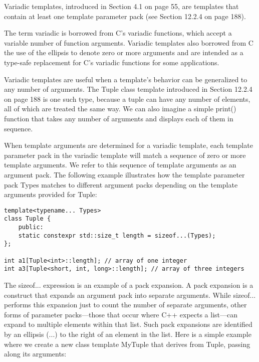 
Variadic templates, introduced in Section 4.1 on page 55, are templates that contain at least one template parameter pack (see Section 12.2.4 on page 188).

\begin{tcolorbox}[colback=webgreen!5!white,colframe=webgreen!75!black]
\hspace*{0.75cm}The term variadic is borrowed from C’s variadic functions, which accept a variable number of function arguments. Variadic templates also borrowed from C the use of the ellipsis to denote zero or more arguments and are intended as a type-safe replacement for C’s variadic functions for some applications.
\end{tcolorbox}

Variadic templates are useful when a template’s behavior can be generalized to any number of arguments. The Tuple class template introduced in Section 12.2.4 on page 188 is one such type, because a tuple can have any number of elements, all of which are treated the same way. We can also imagine a simple print() function that takes any number of arguments and displays each of them in sequence.

When template arguments are determined for a variadic template, each template parameter pack in the variadic template will match a sequence of zero or more template arguments. We refer to this sequence of template arguments as an argument pack. The following example illustrates how the template parameter pack Types matches to different argument packs depending on the template arguments provided for Tuple:

\begin{lstlisting}[style=styleCXX]
template<typename... Types>
class Tuple {
	public:
	static constexpr std::size_t length = sizeof...(Types);
};

int a1[Tuple<int>::length]; // array of one integer
int a3[Tuple<short, int, long>::length]; // array of three integers
\end{lstlisting}


The sizeof... expression is an example of a pack expansion. A pack expansion is a construct that expands an argument pack into separate arguments. While sizeof... performs this expansion just to count the number of separate arguments, other forms of parameter packs—those that occur where C++ expects a list—can expand to multiple elements within that list. Such pack expansions are identified by an ellipsis (...) to the right of an element in the list. Here is a simple example where we create a new class template MyTuple that derives from Tuple, passing along its arguments:

